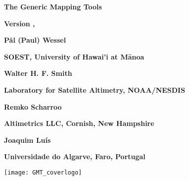 %
%

\thispagestyle{empty}

\begin{center}
\Huge
\textbf{The Generic Mapping Tools}\par 
\vspace{0.5\baselineskip}
\textbf{\GMTTITLE}\par 

\large
\vspace{0.5\baselineskip}
\textbf{Version \GMTDOCVERSION, \GMTDOCDATE}\par 
\vspace{0.25\baselineskip}

\vspace{2.0\baselineskip}

\huge
\textbf{P\aa l (Paul) Wessel}\par 
\vspace{0.5\baselineskip}

\Large
\textbf{SOEST, University of Hawai'i at M\={a}noa}\par 
\vspace{0.5\baselineskip}

\huge
\textbf{Walter H. F. Smith}\par 
\vspace{0.5\baselineskip}

\Large
\textbf{Laboratory for Satellite Altimetry, NOAA/NESDIS}\par 
\vspace{0.5\baselineskip}

\huge
\textbf{Remko Scharroo}\par 
\vspace{0.5\baselineskip}

\Large
\textbf{Altimetrics LLC, Cornish, New Hampshire}\par 
\vspace{0.5\baselineskip}

\huge
\textbf{Joaquim Lu\'is}\par 
\vspace{0.5\baselineskip}

\Large
\textbf{Universidade do Algarve, Faro, Portugal}\par 
\vspace{0.5\baselineskip}


\texttt{[image: GMT\_coverlogo]}
\end{center}
